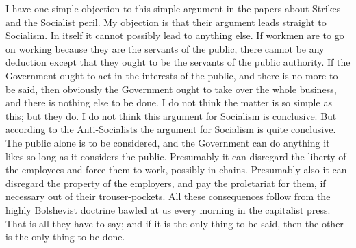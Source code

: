 \documentclass{book}
\begin{document}
I have one simple objection to this simple argument in the papers about Strikes and the Socialist peril. My objection is that their argument leads straight to Socialism. In itself it cannot possibly lead to anything else. If workmen are to go on working because they are the servants of the public, there cannot be any deduction except that they ought to be the servants of the public authority. If the Government ought to act in the interests of the public, and there is no more to be said, then obviously the Government ought to take over the whole business, and there is nothing else to be done. I do not think the matter is so simple as this; but they do. I do not think this argument for Socialism is conclusive. But according to the Anti-Socialists the argument for Socialism is quite conclusive. The public alone is to be considered, and the Government can do anything it likes so long as it considers the public. Presumably it can disregard the liberty of the employees and force them to work, possibly in chains. Presumably also it can disregard the property of the employers, and pay the proletariat for them, if necessary out of their trouser-pockets. All these consequences follow from the highly Bolshevist doctrine bawled at us every morning in the capitalist press. That is all they have to say; and if it is the only thing to be said, then the other is the only thing to be done.
\end{document}
